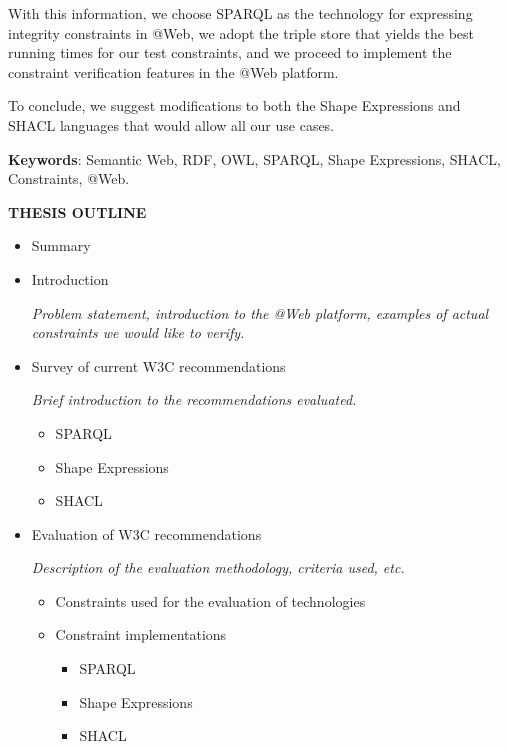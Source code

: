 \documentclass[a4paper, 10pt]{article}
\newcommand{\header}[1]{
  \begin{center}
    \textbf{\uppercase{#1}}
  \end{center}
  \vspace{-1em}
}
\begin{document}
With this information, we choose SPARQL as the technology for expressing
integrity constraints in @Web, we adopt the triple store that yields the best
running times for our test constraints, and we proceed to implement the
constraint verification features in the @Web platform.

To conclude, we suggest modifications to both the Shape Expressions and SHACL
languages that would allow all our use cases.

\textbf{Keywords}: Semantic Web, RDF, OWL, SPARQL, Shape Expressions, SHACL,
Constraints, @Web.


\newpage

\header{Thesis outline}

\begin{itemize}
  \item Summary

  \item Introduction

  \textit{Problem statement, introduction to the @Web platform, examples of
  actual constraints we would like to verify.}

  \item Survey of current W3C recommendations

  \textit{Brief introduction to the recommendations evaluated.}

  \begin{itemize}
    \item SPARQL
    \item Shape Expressions
    \item SHACL
  \end{itemize}

  \item Evaluation of W3C recommendations

  \textit{Description of the evaluation methodology, criteria used, etc.}

  \begin{itemize}
    \item Constraints used for the evaluation of technologies

    \item Constraint implementations

    \begin{itemize}
      \item SPARQL
      \item Shape Expressions
      \item SHACL
    \end{itemize}


\end{itemize}
\end{itemize}
\end{document}
